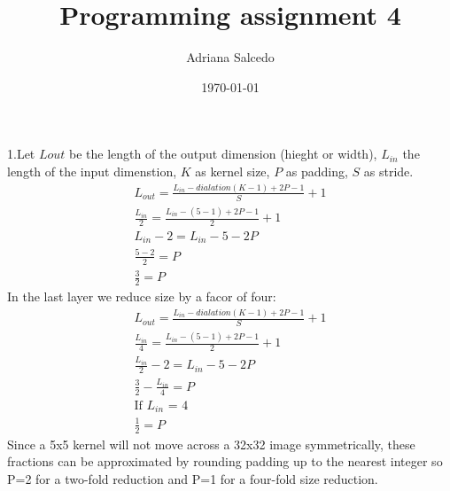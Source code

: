 \documentclass[12pt,letterpaper]{article} %
\title{\Large Programming assignment 4}
\author{\large Adriana Salcedo}
\date{\large \today}
\begin{document}
\maketitle
\section{}
\subsection{}

1.Let $L{out}$ be the length of the output dimension (hieght or width), $L_{in}$ the length of the input dimenstion, $K$ as kernel size, $P$ as padding, $S$ as stride. 
 \\
\begin{align*}
L_{out} = \frac{L_{in}-dialation(K -1) + 2P -1}{S} + 1\\
\frac{L_{in}}{2} = \frac{L_{in} - (5-1)+2P -1}{2} +1\\
L_{in} -2 = L_{in}-5-2P\\
\frac{5-2}{2} =P\\
\frac{3}{2}=P
\end{align*}
In the last layer we reduce size by a facor of four:
\begin{align*}
L_{out} = \frac{L_{in}-dialation(K -1) + 2P -1}{S} + 1\\
\frac{L_{in}}{4} = \frac{L_{in} - (5-1)+2P -1}{2} +1\\
\frac{L_{in}}{2} -2 = L_{in}-5-2P\\
\frac{3}{2}-\frac{L_{in}}{4} = P\\
\text{If $L_{in}$ = 4}\\
\frac{1}{2}=P
\end{align*}
Since a 5x5 kernel will not move across a 32x32 image symmetrically, these fractions can be approximated by rounding padding up to the nearest integer so P=2 for a two-fold reduction and P=1 for a four-fold size reduction.

\section{}
\end{document}
